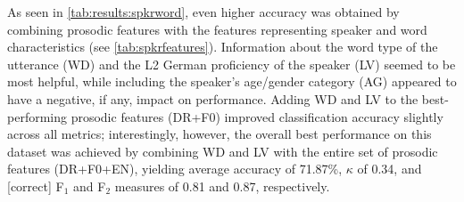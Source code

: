 \documentclass[a4paper]{article}
\begin{document}
		
		As seen in \cref{tab:results:spkrword}, even higher accuracy was obtained by combining prosodic features with the features representing speaker and word characteristics (see \cref{tab:spkrfeatures}). Information about the word type of the utterance (WD) and the L2 German proficiency of the speaker (LV)%
		 seemed to be most helpful, while including the speaker's age/gender category (AG) appeared to have a negative, if any, impact on performance. 
		Adding WD and LV to the best-performing prosodic features (DR+F0) improved classification accuracy slightly across all metrics; interestingly, however, the overall best performance on this dataset was achieved by combining WD and LV with the entire set of prosodic features (DR+F0+EN), yielding average accuracy of 71.87\%, $\kappa$ of 0.34, and [correct] F$_1$ and F$_2$ measures of 0.81 and 0.87, respectively.
		
\end{document}
